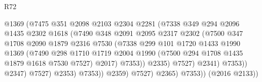 \begin{lexlean}{R72}
\begin{coremodule}
                                    @1369
                                    (@7475
                                      @351
                                      @2098
                                      @2103
                                      @2304
                                      @2281
                                      (@7338
                                        @349
                                        @294
                                        @2096
                                        @1435
                                        @2302
                                        @1618
                                        (@7490
                                          @348
                                          @2091
                                          @2095
                                          @2317
                                          @2302
                                          (@7500
                                            @347
                                            @1708
                                            @2090
                                            @1879
                                            @2316
                                            @7530
                                            (@7338
                                              @299
                                              @101
                                              @1720
                                              @1433
                                              @1990
                                              @1369
                                              (@7490
                                                @298
                                                @1710
                                                @1719
                                                @2004
                                                @1990
                                                (@7500 @294 @1708 @1435 @1879 @1618 @7530 @7527)
                                                @2017)
                                              @7353))
                                          @2335)
                                        @7527)
                                      @2341)
                                    @7353))
                                @2347)
                              @7527)
                            @2353)
                          @7353))
                      @2359)
                    @7527)
                  @2365)
                @7353))
            (@2016 @2133))

\end{coremodule}
\end{lexlean}
